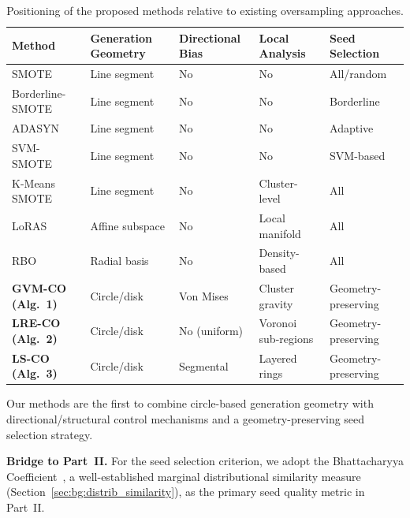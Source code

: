 \begin{table}[ht]
\centering
\caption{Positioning of the proposed methods relative to existing oversampling approaches.}
\label{tab:lit:positioning}
\small
\begin{tabularx}{\textwidth}{l>{\centering\arraybackslash}X>{\centering\arraybackslash}X>{\centering\arraybackslash}X>{\centering\arraybackslash}X}
\toprule
\textbf{Method} & \textbf{Generation Geometry} & \textbf{Directional Bias} & \textbf{Local Analysis} & \textbf{Seed Selection} \\
\midrule
SMOTE~\cite{chawla2002smote} & Line segment & No & No & All/random \\
Borderline-SMOTE~\cite{han2005borderline} & Line segment & No & No & Borderline \\
ADASYN~\cite{he2008adasyn} & Line segment & No & No & Adaptive \\
SVM-SMOTE~\cite{nguyen2011borderline} & Line segment & No & No & SVM-based \\
K-Means SMOTE~\cite{douzas2018improving} & Line segment & No & Cluster-level & All \\
LoRAS~\cite{bej2021loras} & Affine subspace & No & Local manifold & All \\
RBO~\cite{koziarski2020radial} & Radial basis & No & Density-based & All \\
\midrule
\textbf{GVM-CO (Alg.~1)} & Circle/disk & Von Mises & Cluster gravity & Geometry-preserving \\
\textbf{LRE-CO (Alg.~2)} & Circle/disk & No (uniform) & Voronoi sub-regions & Geometry-preserving \\
\textbf{LS-CO (Alg.~3)} & Circle/disk & Segmental & Layered rings & Geometry-preserving \\
\bottomrule
\end{tabularx}
\end{table}

Our methods are the first to combine circle-based generation geometry with directional/structural control mechanisms and a geometry-preserving seed selection strategy.

\medskip

\noindent\textbf{Bridge to Part~II.}
For the seed selection criterion, we adopt the Bhattacharyya Coefficient~\cite{bhattacharyya1943measure}, a well-established marginal distributional similarity measure (Section~\ref{sec:bg:distrib_similarity}), as the primary seed quality metric in Part~II.
